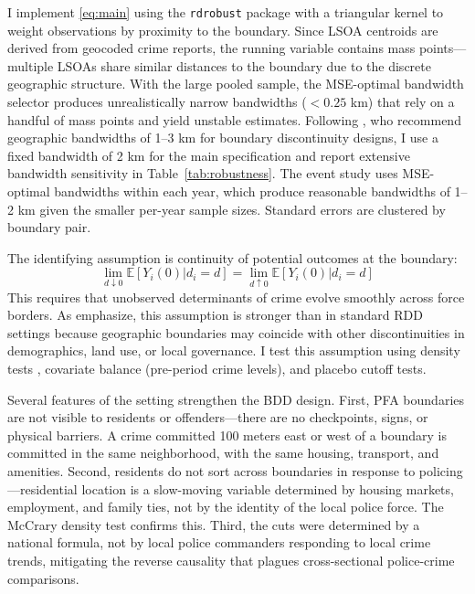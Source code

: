 \documentclass[12pt]{article}
\newcommand{\E}{\mathbb{E}}
\begin{document}
I implement \eqref{eq:main} using the \texttt{rdrobust} package \citep{calonico2014} with a triangular kernel to weight observations by proximity to the boundary. Since LSOA centroids are derived from geocoded crime reports, the running variable contains mass points---multiple LSOAs share similar distances to the boundary due to the discrete geographic structure. With the large pooled sample, the MSE-optimal bandwidth selector produces unrealistically narrow bandwidths ($< 0.25$ km) that rely on a handful of mass points and yield unstable estimates. Following \citet{keele2015}, who recommend geographic bandwidths of 1--3 km for boundary discontinuity designs, I use a fixed bandwidth of 2 km for the main specification and report extensive bandwidth sensitivity in Table~\ref{tab:robustness}. The event study uses MSE-optimal bandwidths within each year, which produce reasonable bandwidths of 1--2 km given the smaller per-year sample sizes. Standard errors are clustered by boundary pair.

The identifying assumption is continuity of potential outcomes at the boundary:
\begin{equation}
\lim_{d \downarrow 0} \E[Y_i(0) | d_i = d] = \lim_{d \uparrow 0} \E[Y_i(0) | d_i = d]
\end{equation}
This requires that unobserved determinants of crime evolve smoothly across force borders. As \citet{keele2015} emphasize, this assumption is stronger than in standard RDD settings because geographic boundaries may coincide with other discontinuities in demographics, land use, or local governance. I test this assumption using density tests \citep{mccrary2008, cattaneo2020}, covariate balance (pre-period crime levels), and placebo cutoff tests.

Several features of the setting strengthen the BDD design. First, PFA boundaries are not visible to residents or offenders---there are no checkpoints, signs, or physical barriers. A crime committed 100 meters east or west of a boundary is committed in the same neighborhood, with the same housing, transport, and amenities. Second, residents do not sort across boundaries in response to policing---residential location is a slow-moving variable determined by housing markets, employment, and family ties, not by the identity of the local police force. The McCrary density test confirms this. Third, the cuts were determined by a national formula, not by local police commanders responding to local crime trends, mitigating the reverse causality that plagues cross-sectional police-crime comparisons.
\end{document}
